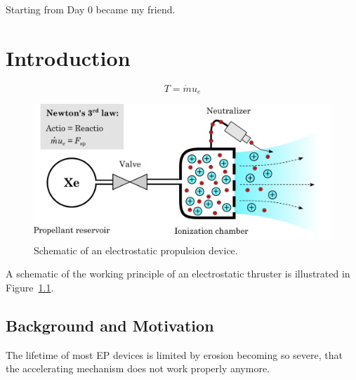 \documentclass[a4paper,twoside]{ociamthesis}
\begin{document}

\flushbottom

\begin{savequote}[8cm]
  Starting from Day 0 became my friend.
  
\end{savequote}

\chapter{\label{ch:introduction}Introduction}

\minitoc

\lipsum[3]

\begin{equation}\label{eq:thrust}
T = \dot{m} u_e
\end{equation}

\begin{figure}[t!]
  \centering
  \includegraphics[width=\textwidth]{fig/1.introduction/final/ep_schematic.pdf}
  \caption{Schematic of an electrostatic propulsion device.}
  \label{fig:ep_schematic}
\end{figure}

A schematic of the working principle of an electrostatic thruster is
illustrated in Figure~\ref{fig:ep_schematic}. 

\section{Background and Motivation}\label{sec:background-and-motivation}

The lifetime of most EP devices is limited by erosion becoming so
severe, that the accelerating mechanism does not work properly anymore.
\end{document}
